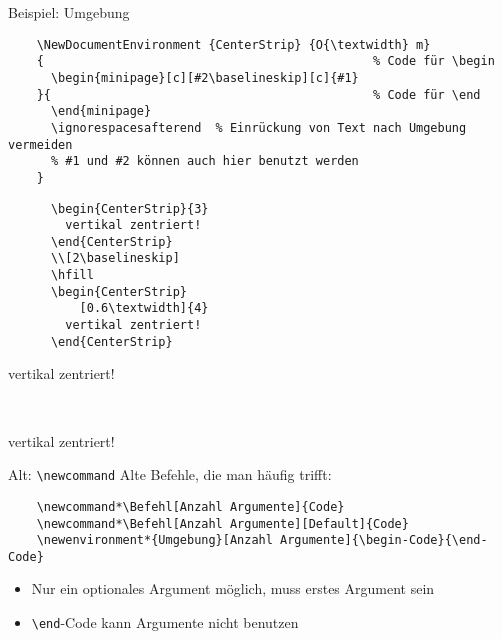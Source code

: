 \begin{frame}[fragile]{Beispiel: Umgebung}
  \begin{lstlisting}
    \NewDocumentEnvironment {CenterStrip} {O{\textwidth} m}
    {                                              % Code für \begin
      \begin{minipage}[c][#2\baselineskip][c]{#1}
    }{                                             % Code für \end
      \end{minipage}
      \ignorespacesafterend  % Einrückung von Text nach Umgebung vermeiden
      % #1 und #2 können auch hier benutzt werden
    }
  \end{lstlisting}

  \begin{CodeExample}{0.5}
    \begin{lstlisting}
      \begin{CenterStrip}{3}
        vertikal zentriert!
      \end{CenterStrip}
      \\[2\baselineskip]
      \hfill
      \begin{CenterStrip}
          [0.6\textwidth]{4}
        vertikal zentriert!
      \end{CenterStrip}
    \end{lstlisting}
  \CodeResult
    \begin{CenterStrip}{3}
      \strut
      vertikal zentriert!
    \end{CenterStrip}
    \\[2\baselineskip]
    \hfill
    \begin{CenterStrip}[0.6\textwidth]{4}
      \strut
      vertikal zentriert!
    \end{CenterStrip}
  \end{CodeExample}
\end{frame}

\begin{frame}[fragile]{Alt: \texttt{\textbackslash newcommand}}
  Alte Befehle, die man häufig trifft:
  \begin{lstlisting}
    \newcommand*\Befehl[Anzahl Argumente]{Code}
    \newcommand*\Befehl[Anzahl Argumente][Default]{Code}
    \newenvironment*{Umgebung}[Anzahl Argumente]{\begin-Code}{\end-Code}
  \end{lstlisting}
  \begin{itemize}
    \item Nur ein optionales Argument möglich, muss erstes Argument sein
    \item \lstinline+\end+-Code kann Argumente nicht benutzen
  \end{itemize}
\end{frame}
